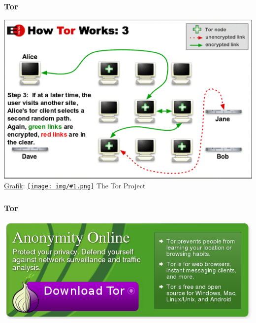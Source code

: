 \documentclass[12pt]{beamer}
\newcommand{\cc}[1]{\texttt{[image: img/\#1.png]}\hspace{1mm}}
\begin{document}
\begin{frame}
    \frametitle{Tor}
    \includegraphics[height=0.7\textheight]{img/tor3.png}
    \\{\small \href{https://www.torproject.org/images/htw3.png}{Grafik}: \href{https://creativecommons.org/licenses/by/3.0/us/}{\cc{by}} The Tor Project}
\end{frame}

\begin{frame}
  \frametitle{Tor}
  \includegraphics[height=0.5\textheight]{img/tor-banner.png}
\end{frame}

\end{document}
